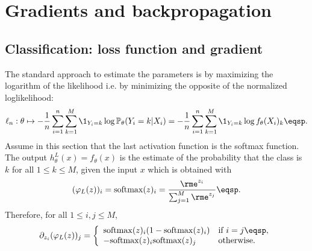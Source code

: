 \section{Gradients and backpropagation}
\subsection{Classification: loss function and gradient}
The standard approach to estimate the parameters is by maximizing the logarithm of the likelihood i.e. by minimizing the opposite of the normalized loglikelihood:
$$
\ell_n:\theta \mapsto -\frac{1}{n} \sum_{i=1}^n\sum_{k=1}^{M} \1_{Y_i=k}\log \mathbb{P}_{\theta}(Y_i = k | X_i) = -\frac{1}{n} \sum_{i=1}^n\sum_{k=1}^{M} \1_{Y_i=k}\log f_{\theta}(X_i)_k\eqsp.
$$
Assume in this section that the last activation function is the softmax function. The output $h_{\theta}^L(x)= f_{\theta}(x) $ is the estimate of the probability that the class is  $k$ for all $1\leqslant k\leqslant M$, given the input $x$ which is obtained with
\[
(\varphi_L(z))_i = \mathrm{softmax}(z)_i = \frac{\rme^{z_i}}{\sum_{j=1}^M\rme^{z_j}}\eqsp.
\]
Therefore, for all $1\leqslant i,j\leqslant M$,
$$
\partial_{z_i}(\varphi_L(z))_j =  \left\{
    \begin{array}{ll}
        \mathrm{softmax}(z)_i (1-\mathrm{softmax}(z)_i ) & \mbox{if } i=j\eqsp,\\
        - \mathrm{softmax}(z)_i \mathrm{softmax}(z)_j & \mbox{otherwise.}
    \end{array}
\right.
$$

